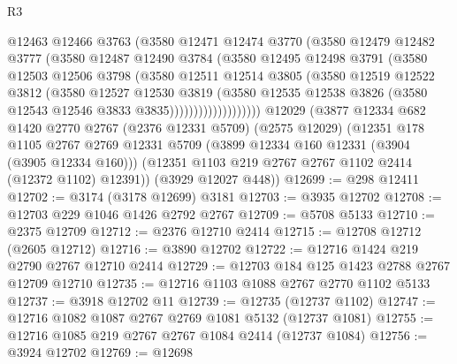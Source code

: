 \begin{lexlean}{R3}
\begin{coremodule}
                      @12463
                      @12466
                      @3763
                      (@3580
                        @12471
                        @12474
                        @3770
                        (@3580
                          @12479
                          @12482
                          @3777
                          (@3580
                            @12487
                            @12490
                            @3784
                            (@3580
                              @12495
                              @12498
                              @3791
                              (@3580
                                @12503
                                @12506
                                @3798
                                (@3580
                                  @12511
                                  @12514
                                  @3805
                                  (@3580
                                    @12519
                                    @12522
                                    @3812
                                    (@3580
                                      @12527
                                      @12530
                                      @3819
                                      (@3580
                                        @12535
                                        @12538
                                        @3826
                                        (@3580 @12543 @12546 @3833 @3835)))))))))))))))))))
    @12029
    (@3877
      @12334
      @682
      @1420
      @2770
      @2767
      (@2376 @12331 @5709)
      (@2575 @12029)
      (@12351
        @178
        @1105
        @2767
        @2769
        @12331
        @5709
        (@3899 @12334 @160 @12331 (@3904 (@3905 @12334 @160)))
        (@12351 @1103 @219 @2767 @2767 @1102 @2414 (@12372 @1102) @12391))
      (@3929 @12027 @448))
@12699 := @298 @12411
@12702 := @3174 (@3178 @12699) @3181
@12703 := @3935 @12702
@12708 := @12703 @229 @1046 @1426 @2792 @2767
@12709 := @5708 @5133
@12710 := @2375 @12709
@12712 := @2376 @12710 @2414
@12715 := @12708 @12712 (@2605 @12712)
@12716 := @3890 @12702
@12722 := @12716 @1424 @219 @2790 @2767 @12710 @2414
@12729 := @12703 @184 @125 @1423 @2788 @2767 @12709 @12710
@12735 := @12716 @1103 @1088 @2767 @2770 @1102 @5133
@12737 := @3918 @12702 @11
@12739 := @12735 (@12737 @1102)
@12747 := @12716 @1082 @1087 @2767 @2769 @1081 @5132 (@12737 @1081)
@12755 := @12716 @1085 @219 @2767 @2767 @1084 @2414 (@12737 @1084)
@12756 := @3924 @12702
@12769 := @12698

\end{coremodule}
\end{lexlean}
